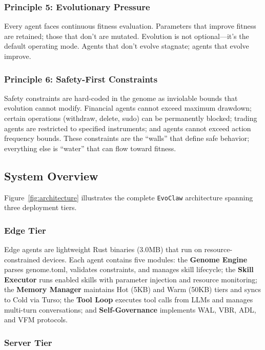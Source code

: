 \documentclass[conference]{IEEEtran}
\newcommand{\evoclaw}{\texttt{EvoClaw}\xspace}
\begin{document}
\subsubsection{Principle 5: Evolutionary Pressure}

Every agent faces continuous fitness evaluation. Parameters that improve fitness are retained; those that don't are mutated. Evolution is not optional—it's the default operating mode. Agents that don't evolve stagnate; agents that evolve improve.

\subsubsection{Principle 6: Safety-First Constraints}

Safety constraints are hard-coded in the genome as inviolable bounds that evolution cannot modify. Financial agents cannot exceed maximum drawdown; certain operations (withdraw, delete, sudo) can be permanently blocked; trading agents are restricted to specified instruments; and agents cannot exceed action frequency bounds. These constraints are the ``walls'' that define safe behavior; everything else is ``water'' that can flow toward fitness.

\subsection{System Overview}

Figure~\ref{fig:architecture} illustrates the complete \evoclaw{} architecture spanning three deployment tiers.

\subsubsection{Edge Tier}

Edge agents are lightweight Rust binaries (3.0MB) that run on resource-constrained devices. Each agent contains five modules: the \textbf{Genome Engine} parses genome.toml, validates constraints, and manages skill lifecycle; the \textbf{Skill Executor} runs enabled skills with parameter injection and resource monitoring; the \textbf{Memory Manager} maintains Hot (5KB) and Warm (50KB) tiers and syncs to Cold via Turso; the \textbf{Tool Loop} executes tool calls from LLMs and manages multi-turn conversations; and \textbf{Self-Governance} implements WAL, VBR, ADL, and VFM protocols.

\subsubsection{Server Tier}
\end{document}
